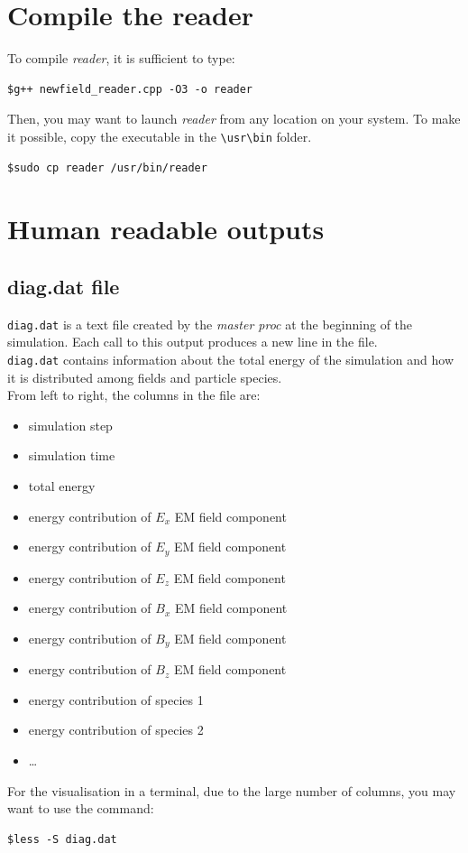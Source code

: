 \documentclass[11pt,a4paper]{report}
\begin{document}
\section{Compile the reader}
To compile \emph{reader}, it is sufficient to type:
\begin{verbatim}
$g++ newfield_reader.cpp -O3 -o reader
\end{verbatim}
Then, you may want to launch \emph{reader} from any location on your system. To make it possible, copy the executable in the \verb+\usr\bin+ folder.
\begin{verbatim}
$sudo cp reader /usr/bin/reader
\end{verbatim}

\section{Human readable outputs}
\subsection{diag.dat file}
\verb+diag.dat+ is a text file created by the \emph{master proc} at the beginning of the simulation. Each call to this output produces a new line in the file.\\
\verb+diag.dat+ contains information about the total energy of the simulation and how it is distributed among fields and particle species. \\
From left to right, the columns in the file are:
\begin{itemize}
\item simulation step
\item simulation time
\item total energy
\item energy contribution of $E_x$ EM field component
\item energy contribution of $E_y$ EM field component
\item energy contribution of $E_z$ EM field component
\item energy contribution of $B_x$ EM field component
\item energy contribution of $B_y$ EM field component
\item energy contribution of $B_z$ EM field component
\item energy contribution of species 1
\item energy contribution of species 2
\item \ldots
\end{itemize}
For the visualisation in a terminal, due to the large number of columns, you may want to use the command:
\begin{verbatim}
$less -S diag.dat
\end{verbatim}
\end{document}
